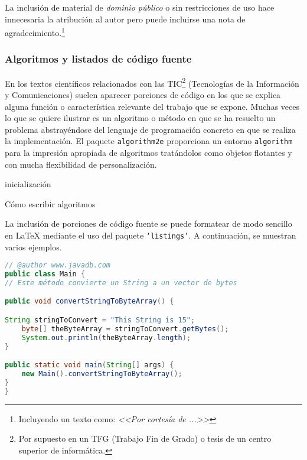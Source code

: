 La inclusión de material de \emph{dominio público} o sin restricciones de uso hace innecesaria la atribución al autor pero puede incluirse una nota de agradecimiento.\footnote{Incluyendo un texto como: \emph{<<Por cortesía de ...>>}}



\subsubsection{Algoritmos y listados de código fuente}
En los textos científicos relacionados con las 
TIC\footnote{Por supuesto en un TFG (Trabajo Fin de Grado) o tesis 
de un centro superior de informática.} (Tecnologías de la Información y 
Comunicaciones) suelen aparecer porciones de código en los que se explica 
alguna función o característica relevante del trabajo que se expone. Muchas 
veces lo que se quiere ilustrar es un algoritmo o método en que se ha 
resuelto un problema abstrayéndose del lenguaje de programación concreto en 
que se realiza la implementación. El paquete \texttt{algorithm2e} proporciona un entorno \texttt{algorithm} para la impresión apropiada de algoritmos tratándolos como objetos flotantes y con mucha flexibilidad de personalización.


\IncMargin{1em}
\begin{algorithm}
\LinesNumbered
\SetAlgoLined


inicialización\;

\caption{Cómo escribir algoritmos}\label{alg:como}
\end{algorithm}\DecMargin{1em}


La inclusión de porciones de código fuente se puede formatear de modo sencillo en \LaTeX{} mediante el uso del paquete \texttt{`listings'}. A continuación, se muestran varios ejemplos.


\begin{lstlisting}[language=Java,caption={[Código fuente en Java]Ejemplo de código fuente en lenguaje Java},label=lst:java]
// @author www.javadb.com
public class Main {    
// Este método convierte un String a un vector de bytes

public void convertStringToByteArray() {

String stringToConvert = "This String is 15";      
	byte[] theByteArray = stringToConvert.getBytes();        
	System.out.println(theByteArray.length);        
}

public static void main(String[] args) {
	new Main().convertStringToByteArray();
}
}
\end{lstlisting}


